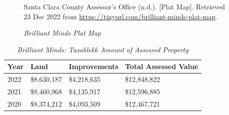 \begin{figure}[t]
  \caption[Brilliant Minds Plat Map]{\textit{Brilliant Minds Plat Map}}
  \label{fig:brilliant-minds-plat-map}
  {Santa Clara County Assessor's Office (n.d.). [Plat Map]. Retrieved 23 Dec 2022 from  \url{https://tinyurl.com/brilliant-minds-plat-map}.}
\end{figure}

\begin{table}[hbtp]
\SingleSpacing%
\caption[Brilliant Minds: Taxable Amount of Assessed Propery]{\textit{Brilliant Minds: Taxablekk Amount of Assessed Property}}%
\label{tab:brilliant-minds-taxable-amount}
  \begin{tabular}{llll}
    \toprule
   Year  & Land        & Improvements & Total Assessed Value \\
    \midrule
    2022 & \$8,630,187 & \$4,218,635  & \$12,848,822 \\
    2021 & \$8,460,968 & \$4,135,917  & \$12,596,885 \\
    2020 & \$8,374,212 & \$4,093,509  & \$12,467,721 \\
    \bottomrule
  \end{tabular}
\end{table}

